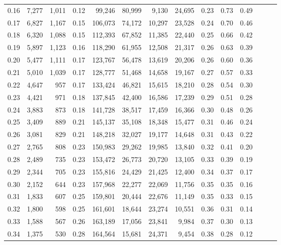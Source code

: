 \begin{tabular}{rrrrrrrrrrrrrr}
0.16 &  7,277 &  1,011 &  0.12 &   99,246 &   80,999 &   9,130 &  24,695 &  0.23 &  0.73 &      0.49 \\
0.17 &  6,827 &  1,167 &  0.15 &  106,073 &   74,172 &  10,297 &  23,528 &  0.24 &  0.70 &      0.46 \\
0.18 &  6,320 &  1,088 &  0.15 &  112,393 &   67,852 &  11,385 &  22,440 &  0.25 &  0.66 &      0.42 \\
0.19 &  5,897 &  1,123 &  0.16 &  118,290 &   61,955 &  12,508 &  21,317 &  0.26 &  0.63 &      0.39 \\
0.20 &  5,477 &  1,111 &  0.17 &  123,767 &   56,478 &  13,619 &  20,206 &  0.26 &  0.60 &      0.36 \\
0.21 &  5,010 &  1,039 &  0.17 &  128,777 &   51,468 &  14,658 &  19,167 &  0.27 &  0.57 &      0.33 \\
0.22 &  4,647 &    957 &  0.17 &  133,424 &   46,821 &  15,615 &  18,210 &  0.28 &  0.54 &      0.30 \\
0.23 &  4,421 &    971 &  0.18 &  137,845 &   42,400 &  16,586 &  17,239 &  0.29 &  0.51 &      0.28 \\
0.24 &  3,883 &    873 &  0.18 &  141,728 &   38,517 &  17,459 &  16,366 &  0.30 &  0.48 &      0.26 \\
0.25 &  3,409 &    889 &  0.21 &  145,137 &   35,108 &  18,348 &  15,477 &  0.31 &  0.46 &      0.24 \\
0.26 &  3,081 &    829 &  0.21 &  148,218 &   32,027 &  19,177 &  14,648 &  0.31 &  0.43 &      0.22 \\
0.27 &  2,765 &    808 &  0.23 &  150,983 &   29,262 &  19,985 &  13,840 &  0.32 &  0.41 &      0.20 \\
0.28 &  2,489 &    735 &  0.23 &  153,472 &   26,773 &  20,720 &  13,105 &  0.33 &  0.39 &      0.19 \\
0.29 &  2,344 &    705 &  0.23 &  155,816 &   24,429 &  21,425 &  12,400 &  0.34 &  0.37 &      0.17 \\
0.30 &  2,152 &    644 &  0.23 &  157,968 &   22,277 &  22,069 &  11,756 &  0.35 &  0.35 &      0.16 \\
0.31 &  1,833 &    607 &  0.25 &  159,801 &   20,444 &  22,676 &  11,149 &  0.35 &  0.33 &      0.15 \\
0.32 &  1,800 &    598 &  0.25 &  161,601 &   18,644 &  23,274 &  10,551 &  0.36 &  0.31 &      0.14 \\
0.33 &  1,588 &    567 &  0.26 &  163,189 &   17,056 &  23,841 &   9,984 &  0.37 &  0.30 &      0.13 \\
0.34 &  1,375 &    530 &  0.28 &  164,564 &   15,681 &  24,371 &   9,454 &  0.38 &  0.28 &      0.12 \\

\end{tabular}
